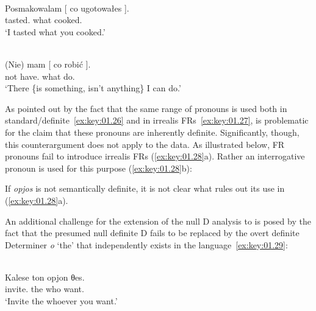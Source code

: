 \documentclass[output=paper]{langsci/langscibook}
\begin{document}
\ea {} \citep[27]{Caponigro2003}\label{ex:key:01.26}\\%
	\gll Posmakowalam [ co ugotowałes ].\\
            tasted.\Fsg{} {} what cooked.\Ssg{}\\
	\glt    \enquote*{I tasted what you cooked.}
\z

\ea {} \citep[88]{Caponigro2003}\label{ex:key:01.27}\\%
    \gll (Nie) mam [ co robić ].\\
            \hphantom{(}not have.\Fsg{} {} what do.\Inf{}\\
	\glt    \enquote*{There \{is something, isn’t anything\} I can do.}
\z

As pointed out by \citet{Caponigro2003} the fact that the same range of
pronouns is used both in standard/definite~\eqref{ex:key:01.26} and in irrealis
\glspl{FR}~\eqref{ex:key:01.27}, is problematic for the claim that these
pronouns are inherently definite.  Significantly, though, this counterargument
does not apply to the  data.  As illustrated below, \gls{FR}
pronouns fail to introduce irrealis \glspl{FR} (\ref{ex:key:01.28}a).  Rather
an interrogative pronoun is used  for this purpose (\ref{ex:key:01.28}b):

\ea {}\label{ex:key:01.28}
	\z
\z

If \emph{opjos} is not semantically definite, it is not clear what rules out
its use in (\ref{ex:key:01.28}a).

An additional challenge for the extension of the null D analysis to  is
posed by the fact that the presumed null definite D fails to be replaced by the
overt definite Determiner \emph{o} ‘the’ that independently exists in the
language~\eqref{ex:key:01.29}:

\ea {}\label{ex:key:01.29}\\
    \gll \llap{*}Kalese ton opjon θes.\\
    invite.\Ssg{} the who want.\Ssg{}\\
    \trans *\enquote*{Invite the whoever you want.}
\z
\end{document}
